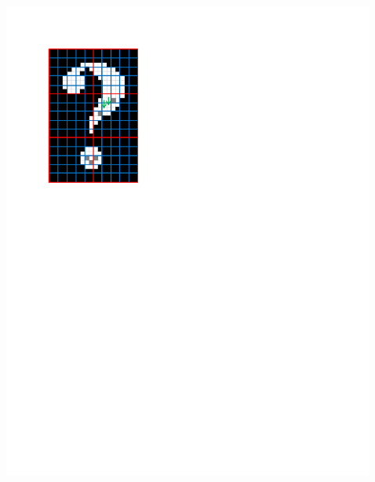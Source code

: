 \documentclass{beamer}
\begin{document}
\begin{frame}
\begin{columns}
\begin{column}{0.45\textwidth}
\end{column}
\end{columns}
\begin{columns}
\begin{column}{0.45\textwidth}
\begin{center}
\includegraphics[width=1\textwidth,trim={0 6.5in 4in 1in},clip]{replace_defect_1}
\end{center}
\end{column}
\begin{column}{0.1\textwidth}
\end{column}
\begin{column}{0.45\textwidth}
\begin{center}

\end{center}
\end{column}
\end{columns}
\end{frame}
\end{document}
